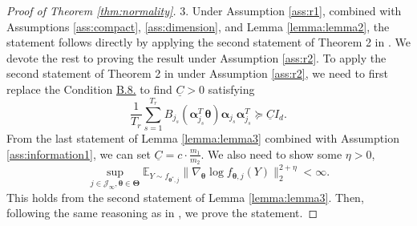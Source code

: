 \documentclass[12pt]{article}
\newcommand{\bfTheta}{\boldsymbol{\Theta}}
\newcommand{\bfalpha}{\boldsymbol{\alpha}}
\newcommand{\bftheta}{\boldsymbol{\theta}}
\begin{document}
\begin{proof}[Proof of Theorem \ref{thm:normality}]
3. Under Assumption \ref{ass:r1}, combined with Assumptions \ref{ass:compact},
\ref{ass:dimension}, and Lemma \ref{lemma:lemma2}, the statement follows directly by applying the second statement of Theorem 2 in . We devote the rest to proving the result under Assumption \ref{ass:r2}. To apply the second statement of Theorem 2 in  under Assumption \ref{ass:r2}, we
need to first replace the Condition \hyperref[c:c6b]{B.8.} to find $\underline{C} > 0$ satisfying
\begin{equation*}
\frac{1}{T_r} \sum_{s=1}^{T_r} B_{j_s}(\bfalpha_{j_s}^T \bftheta) \bfalpha_{j_s} \bfalpha_{j_s}^T \succeq \underline{C} I_d.
\end{equation*}
From the last statement of Lemma \ref{lemma:lemma3} combined with Assumption \ref{ass:information1}, we can set $\underline{C} = c \cdot \frac{m_1}{m_2}$. We also need to show some $\eta > 0$,
\begin{equation} \label{e:target5}
\sup_{j \in \mathcal{J}_{\infty}, \bftheta \in \bfTheta} \mathbb{E}_{Y \sim f_{\bftheta^{\ast}, j}} \| \nabla_{\bftheta} \log f_{\bftheta, j}(Y) \|_2^{2 + \eta} < \infty. 
\end{equation}
This holds from the second statement of Lemma \ref{lemma:lemma3}. Then, following the same reasoning as in , we prove the statement. 
\end{proof}
\end{document}
